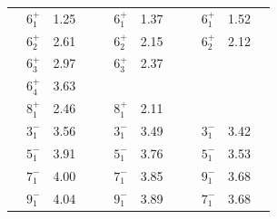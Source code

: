 \documentclass{article}
\begin{document}
\begin{table}[htbp]
\begin{center}
\begin{tabular}{|cccc|cccc|cccc|}
\hline
& $6^{+}_{1}$ & 1.25   &&   &$6^{+}_{1}$ & 1.37   &&   &$6^{+}_{1}$ & 1.52   &\\
& $6^{+}_{2}$ & 2.61   &&   &$6^{+}_{2}$ & 2.15   &&   &$6^{+}_{2}$ & 2.12   &\\
& $6^{+}_{3}$ & 2.97   &&   &$6^{+}_{3}$ & 2.37   &&   &            &        &\\
& $6^{+}_{4}$ & 3.63   &&   &            &        &&   &            &        &\\

\hline
& $8^{+}_{1}$ & 2.46   &&   &$8^{+}_{1}$ & 2.11   &&   &            &        &\\


\hline
& $3^{-}_{1}$ & 3.56   &&   &$3^{-}_{1}$ & 3.49   &&   &$3^{-}_{1}$ &  3.42  &\\

& $5^{-}_{1}$ & 3.91   &&   &$5^{-}_{1}$ & 3.76   &&   &$5^{-}_{1}$ &  3.53  &\\

& $7^{-}_{1}$ & 4.00   &&   &$7^{-}_{1}$ & 3.85   &&   &$9^{-}_{1}$ &  3.68  &\\

& $9^{-}_{1}$ & 4.04   &&   &$9^{-}_{1}$ & 3.89   &&   &$7^{-}_{1}$ &  3.68  &\\


\hline
\end{tabular}
\end{center}
\end{table}
\end{document}
